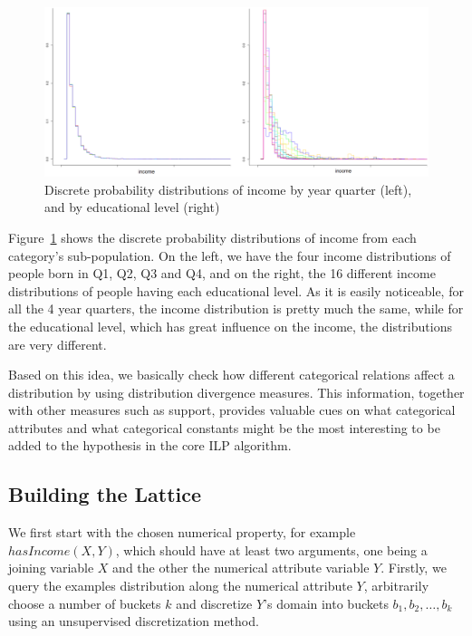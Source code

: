 \begin{figure}[h!]
\caption{Discrete probability distributions of income by year quarter (left), and by educational level (right)}
\begin{center}
  \includegraphics[width=1\linewidth]{./Figures/birthquarter-education.png}
\end{center}
\label{fig:income-education}
\end{figure}

Figure~\ref{fig:income-education} shows the discrete probability distributions of income from each category's
sub-population. On the left, we have the four income distributions of people born in Q1, Q2, Q3 and Q4, and on the
right, the 16 different income distributions of people having each educational level. As it is easily noticeable, for
all the 4 year quarters, the income distribution is pretty much the same, while for the educational level, which has
great influence on the income, the distributions are very different.

Based on this idea, we basically check how different categorical relations affect a distribution by using
distribution divergence measures. This information, together with other measures such as support, provides valuable
cues on what categorical attributes and what categorical constants might be the most interesting to be added to the
hypothesis in the core ILP algorithm.


\subsection{Building the Lattice}

We first start with the chosen numerical property, for example $hasIncome(X,Y)$, which should have at least two
arguments, one being a joining variable $X$ and the other the numerical attribute variable $Y$. Firstly, we query the
examples distribution along the numerical attribute $Y$, arbitrarily choose a number of buckets $k$ and discretize
$Y$'s domain into buckets $b_1, b_2, \dots, b_k$ using an unsupervised discretization method. 

